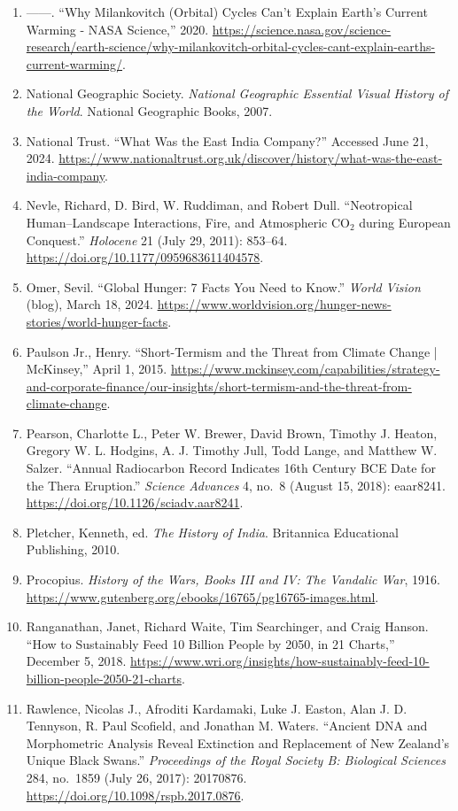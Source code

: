 \documentclass[12pt]{article}
\begin{document}
\begin{enumerate}[leftmargin=*]
\item ---{}---. ``Why Milankovitch (Orbital) Cycles Can’t Explain Earth’s Current Warming - NASA Science,'' 2020. \url{https://science.nasa.gov/science-research/earth-science/why-milankovitch-orbital-cycles-cant-explain-earths-current-warming/}.
\item National Geographic Society. \textit{National Geographic Essential Visual History of the World}. National Geographic Books, 2007.
\item National Trust. ``What Was the East India Company?'' Accessed June 21, 2024. \url{https://www.nationaltrust.org.uk/discover/history/what-was-the-east-india-company}.
\item Nevle, Richard, D. Bird, W. Ruddiman, and Robert Dull. ``Neotropical Human--Landscape Interactions, Fire, and Atmospheric CO$_2$ during European Conquest.'' \textit{Holocene} 21 (July 29, 2011): 853--64. \url{https://doi.org/10.1177/0959683611404578}.
\item Omer, Sevil. ``Global Hunger: 7 Facts You Need to Know.'' \textit{World Vision} (blog), March 18, 2024. \url{https://www.worldvision.org/hunger-news-stories/world-hunger-facts}.
\item Paulson Jr., Henry. ``Short-Termism and the Threat from Climate Change | McKinsey,'' April 1, 2015. \url{https://www.mckinsey.com/capabilities/strategy-and-corporate-finance/our-insights/short-termism-and-the-threat-from-climate-change}.
\item Pearson, Charlotte L., Peter W. Brewer, David Brown, Timothy J. Heaton, Gregory W. L. Hodgins, A. J. Timothy Jull, Todd Lange, and Matthew W. Salzer. ``Annual Radiocarbon Record Indicates 16th Century BCE Date for the Thera Eruption.'' \textit{Science Advances} 4, no.\ 8 (August 15, 2018): eaar8241. \url{https://doi.org/10.1126/sciadv.aar8241}.
\item Pletcher, Kenneth, ed. \textit{The History of India}. Britannica Educational Publishing, 2010.
\item Procopius. \textit{History of the Wars, Books III and IV: The Vandalic War}, 1916. \url{https://www.gutenberg.org/ebooks/16765/pg16765-images.html}.
\item Ranganathan, Janet, Richard Waite, Tim Searchinger, and Craig Hanson. ``How to Sustainably Feed 10 Billion People by 2050, in 21 Charts,'' December 5, 2018. \url{https://www.wri.org/insights/how-sustainably-feed-10-billion-people-2050-21-charts}.
\item Rawlence, Nicolas J., Afroditi Kardamaki, Luke J. Easton, Alan J. D. Tennyson, R. Paul Scofield, and Jonathan M. Waters. ``Ancient DNA and Morphometric Analysis Reveal Extinction and Replacement of New Zealand’s Unique Black Swans.'' \textit{Proceedings of the Royal Society B: Biological Sciences} 284, no.\ 1859 (July 26, 2017): 20170876. \url{https://doi.org/10.1098/rspb.2017.0876}.

\end{enumerate}
\end{document}
